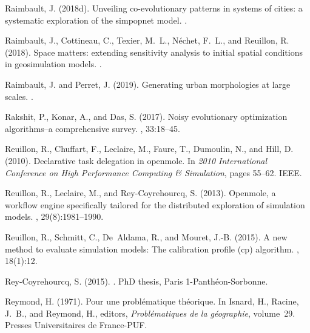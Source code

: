\documentclass[10pt]{article}
\begin{document}
\begin{thebibliography}{}
Raimbault, J. (2018d).
\newblock Unveiling co-evolutionary patterns in systems of cities: a systematic
  exploration of the simpopnet model.
.

Raimbault, J., Cottineau, C., Texier, M.~L., N{\'e}chet, F.~L., and Reuillon,
  R. (2018).
\newblock Space matters: extending sensitivity analysis to initial spatial
  conditions in geosimulation models.
.

Raimbault, J. and Perret, J. (2019).
\newblock Generating urban morphologies at large scales.
.

Rakshit, P., Konar, A., and Das, S. (2017).
\newblock Noisy evolutionary optimization algorithms--a comprehensive survey.
, 33:18--45.

Reuillon, R., Chuffart, F., Leclaire, M., Faure, T., Dumoulin, N., and Hill, D.
  (2010).
\newblock Declarative task delegation in openmole.
\newblock In {\em 2010 International Conference on High Performance Computing
  \& Simulation}, pages 55--62. IEEE.

Reuillon, R., Leclaire, M., and Rey-Coyrehourcq, S. (2013).
\newblock Openmole, a workflow engine specifically tailored for the distributed
  exploration of simulation models.
, 29(8):1981--1990.

Reuillon, R., Schmitt, C., De~Aldama, R., and Mouret, J.-B. (2015).
\newblock A new method to evaluate simulation models: The calibration profile
  (cp) algorithm.
,
  18(1):12.

Rey-Coyrehourcq, S. (2015).
.
\newblock PhD thesis, Paris 1-Panth{\'e}on-Sorbonne.

Reymond, H. (1971).
\newblock Pour une problématique théorique.
\newblock In Isnard, H., Racine, J.~B., and Reymond, H., editors, {\em
  Probl{\'e}matiques de la g{\'e}ographie}, volume~29. Presses Universitaires
  de France-PUF.


\end{thebibliography}
\end{document}
